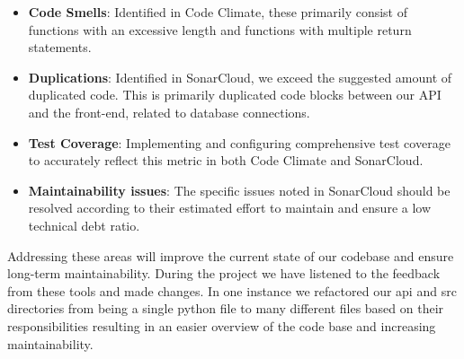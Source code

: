 \begin{itemize}
    \item \textbf{Code Smells}: Identified in Code Climate, these primarily consist of functions with an excessive length and functions with multiple return statements. 
    \item \textbf{Duplications}: Identified in SonarCloud, we exceed the suggested amount of duplicated code. This is primarily duplicated code blocks between our API and the front-end, related to database connections.  
    \item \textbf{Test Coverage}: Implementing and configuring comprehensive test coverage to accurately reflect this metric in both Code Climate and SonarCloud.
    \item \textbf{Maintainability issues}: The specific issues noted in SonarCloud should be resolved according to their estimated effort to maintain and ensure a low technical debt ratio.
\end{itemize}

Addressing these areas will improve the current state of our codebase and ensure long-term maintainability. During the project we have listened to the feedback from these tools and made changes. 
In one instance we refactored our api and src directories from being a single python file to many different files based on their responsibilities resulting in an easier overview of the code base and increasing maintainability.
